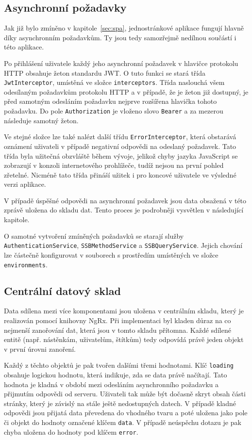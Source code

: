 \subsection{Asynchronní požadavky}
Jak již bylo zmíněno v kapitole~\ref{sec:spa}, jednostránkové aplikace fungují hlavně díky asynchronním požadavkům. Ty jsou tedy samozřejmě nedílnou součástí i této aplikace.

Po přihlášení uživatele každý jeho asynchronní požadavek v hlavičce protokolu HTTP obsahuje žeton standardu JWT. O tuto funkci se stará třída \texttt{JwtInterceptor}, umístěná ve složce \texttt{interceptors}. Třída naslouchá všem odesílaným požadavkům protokolu HTTP a v případě, že je žeton již dostupný, je před samotným odesláním požadavku nejprve rozšířena hlavička tohoto požadavku. Do pole \texttt{Authorization} je vloženo slovo \texttt{Bearer} a za mezerou následuje samotný žeton.

Ve stejné složce lze také nalézt další třídu \texttt{ErrorInterceptor}, která obstarává oznámení uživateli v případě negativní odpovědi na odeslaný požadavek. Tato třída byla užitečná obzvláště během vývoje, jelikož chyby jazyka JavaScript se zobrazují v konzoli internetového prohlížeče, tudíž nejsou na první pohled zřetelné. Nicméně tato třída přináší užitek i pro koncové uživatele ve výsledné verzi aplikace.

V případě úspěšné odpovědi na asynchronní požadavek jsou data obsažená v této zprávě uložena do skladu dat. Tento proces je podrobněji vysvětlen v následující kapitole.

O samotné vytvoření zmíněných požadavků se starají služby \texttt{AuthenticationService}, \texttt{SSBMethodService} a \texttt{SSBQueryService}. Jejich chování lze částečně konfigurovat v souborech s prostředím umístěných ve složce \texttt{environments}.


\subsection{Centrální datový sklad}
Data sdílena mezi více komponentami jsou uložena v centrálním skladu, který je realizován pomocí knihovny NgRx. Při implementaci byl kladen důraz na co nejmenší zanořování dat, která jsou v tomto skladu přítomna. Každé sdílené entitě (např. nástěnkám, uživatelům, štítkům) tedy odpovídá právě jeden objekt v první úrovni zanoření.

Každý z těchto objektů je pak tvořen dalšími třemi hodnotami. Klíč \texttt{loading} obsahuje logickou hodnotu, která indikuje, zda se data právě načítají. Tato hodnota je kladná v období mezi odesláním asynchronního požadavku a přijmutím odpovědi od serveru. Uživateli tak může být dočasně skryt obsah části stránky, který je závislý na stále ještě nedostupných datech. V případě kladné odpovědi jsou přijatá data převedena do vhodného tvaru a poté uložena jako pole či objekt do hodnoty označené klíčem \texttt{data}. V případě neúspěchu dotazu je pak chyba uložena do hodnoty pod klíčem \texttt{error}.

